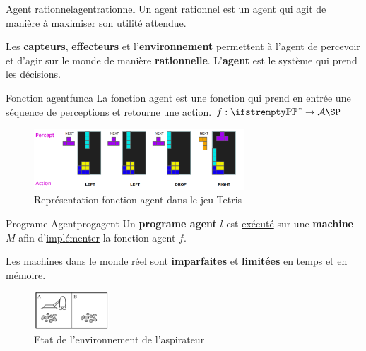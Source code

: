 \documentclass[a4paper, 12pt]{extarticle}
\begin{document}
\begin{definition}{Agent rationnel}{agentrationnel}
    Un agent rationnel est un agent qui agit de manière à maximiser son utilité attendue. 
\end{definition}

\begin{remark}\leavevmode
    Les \textbf{capteurs}, \textbf{effecteurs} et l'\textbf{environnement} permettent à l'agent 
    de percevoir et d'agir sur le monde de manière \textbf{rationnelle}. L'\textbf{agent} est le système qui prend les décisions.
\end{remark}

\begin{definition}{Fonction agent}{funca}
    La fonction agent est une fonction qui prend en entrée une séquence de perceptions et retourne une action.
    \begin{math}
        f: \PP^* \rightarrow \SA \SP
    \end{math}
\end{definition}

\begin{example}\leavevmode
    \begin{figure}[H]
        \centering
        \includegraphics[width=0.7\textwidth]{./pictures/agent_func.png}
        \caption{Représentation fonction agent dans le jeu Tetris}
        \label{fig:agent} 
    \end{figure}
\end{example}

\begin{definition}{Programe Agent}{progagent}
    Un \textbf{programe agent} $l$ est \underline{exécuté} sur une \textbf{machine} $M$ 
    afin d'\underline{implémenter} la fonction agent $f$.
\end{definition}
\begin{remark}\leavevmode
    Les machines dans le monde réel sont \textbf{imparfaites} et \textbf{limitées} en temps et en mémoire.
\end{remark}

\begin{figure}[H]
    \begin{center}
        \includegraphics[width=0.25\textwidth]{./pictures/vac_state.png}
    \end{center}
    \caption{Etat de l'environnement de l'aspirateur}\label{fig:vac_state}
\end{figure}
\end{document}
